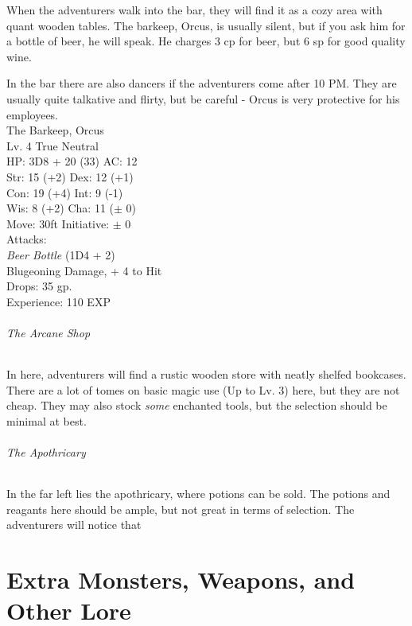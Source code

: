 \documentclass[10pt]{report}
\begin{document}
\begin{multicols}{2}
When the adventurers walk into the bar, they will find it as a cozy area with quant wooden tables. The barkeep, Orcus, is usually silent, but if you ask him for a bottle of beer, he will speak. He charges 3 cp for beer, but 6 sp for good quality wine.

In the bar there are also dancers if the adventurers come after 10 PM. They are usually quite talkative and flirty, but be careful - Orcus is very protective for his employees.\\

\columnbreak
The Barkeep, Orcus \\
Lv. 4 True Neutral \\
HP: 3D8 + 20 (33) AC: 12 \\
Str: 15 (+2) Dex: 12 (+1) \\
Con: 19 (+4) Int:  9 (-1) \\
Wis: 8  (+2) Cha: 11 ($\pm$ 0) \\
Move: 30ft Initiative: $\pm$ 0 \\
Attacks: 
\medskip \\
\textit{Beer Bottle} (1D4 + 2)  \\
Blugeoning Damage, + 4 to Hit 
\medskip \\
Drops: 35 gp. 
\medskip \\
Experience: 110 EXP \\
\end{multicols}

\paragraph{The Arcane Shop}
In here, adventurers will find a rustic wooden store with neatly shelfed bookcases. There are a lot of tomes on basic magic use (Up to Lv. 3) here, but they are not cheap. They may also stock \textit{some} enchanted tools, but the selection should be minimal at best.

\paragraph{The Apothricary}
In the far left lies the apothricary, where potions can be sold. The potions and reagants here should be ample, but not great in terms of selection. The adventurers will notice that 

\part{Extra Monsters, Weapons, and Other Lore}
  
\end{document}
